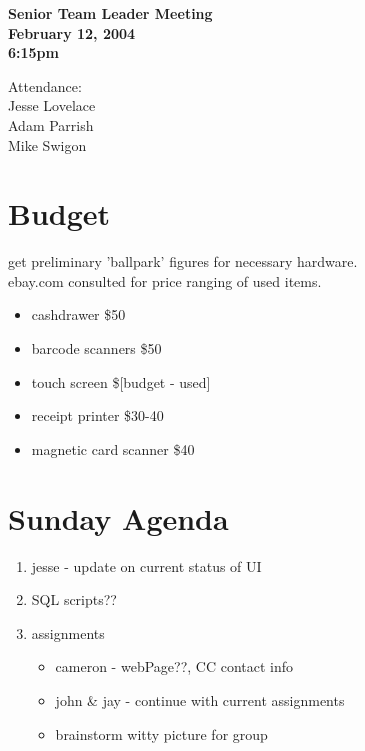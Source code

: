 \documentclass{article}
\begin{document}
\begin{flushleft}
{\bf Senior Team Leader Meeting}\\
{\bf February 12, 2004}\\
{\bf 6:15pm}\\
\end{flushleft}

\begin{flushleft}
Attendance:\\
Jesse Lovelace \\
Adam Parrish \\
Mike Swigon \\
\end{flushleft}

\section{Budget}
get preliminary 'ballpark' figures for necessary hardware.\\
ebay.com consulted for price ranging of used items.
\begin{itemize}
    \item cashdrawer \$50
    \item barcode scanners \$50
    \item touch screen \$[budget - used]
    \item receipt printer \$30-40
    \item magnetic card scanner \$40
\end{itemize}

\section{Sunday Agenda}
\begin{enumerate}
    \item jesse - update on current status of UI
    \item SQL scripts??
    \item assignments
    \begin{itemize}
        \item cameron - webPage??, CC contact info
        \item john \& jay - continue with current assignments
        \item brainstorm witty picture for group
    \end{itemize}
\end{enumerate}
\end{document}
